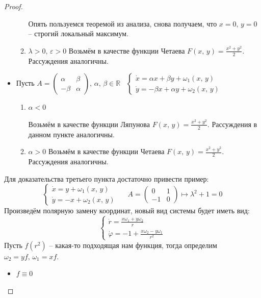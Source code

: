 \documentclass[a4paper,12pt]{article}
\renewcommand{\phi}{\ensuremath{\varphi}}
\theoremstyle{plain}
\theoremstyle{definition}
\theoremstyle{remark}
\begin{document}
\begin{proof}
\begin{itemize}
\begin{enumerate}
			            Опять пользуемся теоремой из анализа, снова получаем, что $x = 0,\, y = 0$ -- строгий локальный максимум.
			      \item $\lambda > 0,\, \varepsilon > 0$
			            Возьмём в качестве функции Четаева $F(x,\,y) = \frac{x^2 + y^2}{2}$. Рассуждения аналогичны.
		      \end{enumerate}
		\item Пусть $A = \begin{pmatrix}
				      \alpha & \beta  \\
				      -\beta & \alpha
			      \end{pmatrix},\, \alpha,\, \beta \in \mathbb{R}\;\;\; \begin{cases}
				      \dot{x} = \alpha x + \beta y + \omega_1(x,\,y) \\
				      \dot{y} = -\beta x + \alpha y + \omega_2(x,\,y)
			      \end{cases}$

		      \begin{enumerate}
			      \item $\alpha < 0$

			            Возьмём в качестве функции Ляпунова $F(x,\,y) = \frac{x^2 + y^2}{2}$. Рассуждения в данном пункте аналогичны.
			      \item $\alpha > 0$
			            Возьмём в качестве функции Четаева $F(x,\,y) = \frac{x^2 + y^2}{2}$. Рассуждения аналогичны.
		      \end{enumerate}
	\end{itemize}

	Для доказательства третьего пункта достаточно привести пример:
	\[\begin{cases}
			\dot{x} = y + \omega_1(x,\,y) \\
			\dot{y} = -x + \omega_2(x,\,y)
		\end{cases}\;\;\;\;\; A = \begin{pmatrix}
			0  & 1 \\
			-1 & 0
		\end{pmatrix} \mapsto \lambda^2 + 1 = 0\]
	Произведём полярную замену координат, новый вид системы будет иметь вид:
	\[\begin{cases}
			\dot{r} = \frac{x\omega_1 + y\omega_2}{r} \\
			\dot{\phi} = -1 + \frac{x\omega_2 - y\omega_1}{r^2}
		\end{cases}\]
	Пусть $f(r^2)$ -- какая-то подходящая нам функция, тогда определим $\omega_2 = yf,\, \omega_1 = xf$.
	\begin{itemize}
		\item $f \equiv 0$


\end{itemize}
\end{proof}
\end{document}
